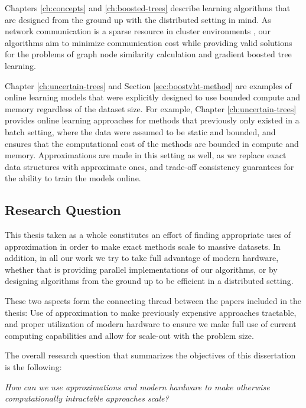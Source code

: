 Chapters \ref{ch:concepts} and \ref{ch:boosted-trees} describe learning algorithms that
are designed from the ground up with the distributed setting in mind. As network
communication is a sparse resource in cluster environments \cite{optimization-communication-complexity},
our algorithms aim to minimize communication cost while providing valid
solutions for the problems of graph node similarity calculation and gradient
boosted tree learning.

Chapter \ref{ch:uncertain-trees} and Section \ref{sec:boostvht-method}
are examples of online learning models
that were explicitly designed to use bounded compute and memory regardless of the
dataset size. For example, Chapter \ref{ch:uncertain-trees} provides online learning approaches
for methods that previously only existed in a batch setting, where the data were assumed to be
static and bounded, and ensures that the computational cost of the methods are
bounded in compute and memory. Approximations are made in this setting as well,
as we replace exact data structures with approximate ones, and trade-off consistency
guarantees for the ability to train the models online.


\subsection{Research Question}

This thesis taken as a whole constitutes an effort of finding appropriate
uses of approximation in order to make exact methods scale to massive datasets.
In addition, in all our work we try to take full advantage of modern hardware,
whether that is providing parallel implementations of our algorithms,
or by designing algorithms from the
ground up to be efficient in a distributed setting.

These two aspects form the connecting thread between the papers
included in the thesis: Use of approximation to make previously expensive approaches tractable, and
proper utilization of modern hardware to ensure we make full use of current
computing capabilities and allow for scale-out with the problem size.

The overall research question that summarizes the objectives of this dissertation is the following:

\begin{displayquote}
	\emph{How can we use approximations and modern hardware to make otherwise computationally
		intractable approaches scale?}
\end{displayquote}


